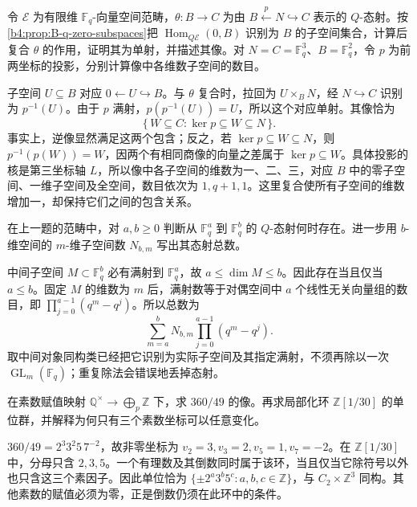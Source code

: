 \begin{exercise}\label{b4:ex:B-q-zero-arrows}
	令 \(\mathcal E\) 为有限维 \(\mathbb F_q\)-向量空间范畴，\(\theta:B\to C\) 为由 \(B\xleftarrow{p}N\hookrightarrow C\) 表示的 \(Q\)-态射。按\cref{b4:prop:B-q-zero-subspaces}把 \(\operatorname{Hom}_{Q\mathcal E}(0,B)\) 识别为 \(B\) 的子空间集合，计算后复合 \(\theta\) 的作用，证明其为单射，并描述其像。对 \(N=C=\mathbb F_q^3\)、\(B=\mathbb F_q^2\)，令 \(p\) 为前两坐标的投影，分别计算像中各维数子空间的数目。
\end{exercise}
\begin{solution}
	子空间 \(U\subseteq B\) 对应 \(0\leftarrow U\hookrightarrow B\)。与 \(\theta\) 复合时，拉回为 \(U\times_BN\)，经 \(N\hookrightarrow C\) 识别为 \(p^{-1}(U)\)。由于 \(p\) 满射，\(p(p^{-1}(U))=U\)，所以这个对应单射。其像恰为
	\[
		\{\,W\subseteq C:\ker p\subseteq W\subseteq N\,\}.
	\]
	事实上，逆像显然满足这两个包含；反之，若 \(\ker p\subseteq W\subseteq N\)，则 \(p^{-1}(p(W))=W\)，因两个有相同商像的向量之差属于 \(\ker p\subseteq W\)。具体投影的核是第三坐标轴 \(L\)，所以像中各子空间的维数为一、二、三，对应 \(B\) 中的零子空间、一维子空间及全空间，数目依次为 \(1,q+1,1\)。这里复合使所有子空间的维数增加一，却保持它们之间的包含关系。
\end{solution}

\begin{exercise}\label{b4:ex:B-q-dimension}
	在上一题的范畴中，对 \(a,b\ge0\) 判断从 \(\mathbb F_q^a\) 到 \(\mathbb F_q^b\) 的 \(Q\)-态射何时存在。进一步用 \(b\)-维空间的 \(m\)-维子空间数 \(N_{b,m}\) 写出其态射总数。
\end{exercise}
\begin{solution}
	中间子空间 \(M\subset\mathbb F_q^b\) 必有满射到 \(\mathbb F_q^a\)，故 \(a\le\dim M\le b\)。因此存在当且仅当 \(a\le b\)。固定 \(M\) 的维数为 \(m\) 后，满射数等于对偶空间中 \(a\) 个线性无关向量组的数目，即 \(\prod_{j=0}^{a-1}(q^m-q^j)\)。所以总数为
	\[
		\sum_{m=a}^bN_{b,m}\prod_{j=0}^{a-1}(q^m-q^j).
	\]
	取中间对象同构类已经把它识别为实际子空间及其指定满射，不须再除以一次 \(\operatorname{GL}_m(\mathbb F_q)\)；重复除法会错误地丢掉态射。
\end{solution}

\begin{exercise}\label{b4:ex:B-localization-arithmetic}
	在素数赋值映射 \(\mathbb Q^\times\rightarrow\bigoplus_p\mathbb Z\) 下，求 \(360/49\) 的像。再求局部化环 \(\mathbb Z[1/30]\) 的单位群，并解释为何只有三个素数坐标可以任意变化。
\end{exercise}
\begin{solution}
	\(360/49=2^3 3^2 5\,7^{-2}\)，故非零坐标为 \(v_2=3,v_3=2,v_5=1,v_7=-2\)。在 \(\mathbb Z[1/30]\) 中，分母只含 \(2,3,5\)。一个有理数及其倒数同时属于该环，当且仅当它除符号以外也只含这三个素因子。因此单位恰为 \(\{\pm2^a3^b5^c:a,b,c\in\mathbb Z\}\)，与 \(C_2\times\mathbb Z^3\) 同构。其他素数的赋值必须为零，正是倒数仍须在此环中的条件。
\end{solution}

